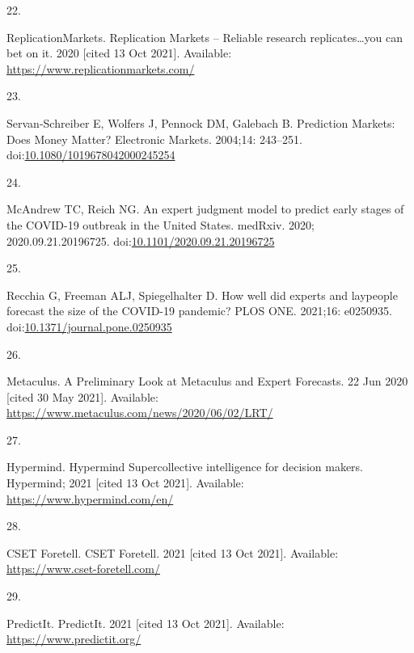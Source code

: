 \documentclass[10pt,letterpaper]{article}
\newlength{\cslhangindent}
\newlength{\csllabelwidth}
\newlength{\cslentryspacingunit} %
\newenvironment{CSLReferences}[2] %
 {%
  \setlength{\parindent}{0pt}
  \ifodd #1
  \let\oldpar\par
  \def\par{\hangindent=\cslhangindent\oldpar}
  \fi
  \setlength{\parskip}{#2\cslentryspacingunit}
 }%
 {}
\newcommand{\CSLLeftMargin}[1]{\parbox[t]{\csllabelwidth}{#1}}
\newcommand{\CSLRightInline}[1]{\parbox[t]{\linewidth - \csllabelwidth}{#1}\break}
\begin{document}
\begin{CSLReferences}{0}{0}
\leavevmode{}%
\CSLLeftMargin{22. }
\CSLRightInline{ReplicationMarkets. Replication {Markets} -- {Reliable}
research replicates\ldots you can bet on it. 2020 {[}cited 13 Oct
2021{]}. Available: \url{https://www.replicationmarkets.com/}}

\leavevmode{}%
\CSLLeftMargin{23. }
\CSLRightInline{Servan-Schreiber E, Wolfers J, Pennock DM, Galebach B.
Prediction {Markets}: {Does Money Matter}? Electronic Markets. 2004;14:
243--251.
doi:\href{https://doi.org/10.1080/1019678042000245254}{10.1080/1019678042000245254}}

\leavevmode{}%
\CSLLeftMargin{24. }
\CSLRightInline{McAndrew TC, Reich NG. An expert judgment model to
predict early stages of the {COVID-19} outbreak in the {United States}.
medRxiv. 2020; 2020.09.21.20196725.
doi:\href{https://doi.org/10.1101/2020.09.21.20196725}{10.1101/2020.09.21.20196725}}

\leavevmode{}%
\CSLLeftMargin{25. }
\CSLRightInline{Recchia G, Freeman ALJ, Spiegelhalter D. How well did
experts and laypeople forecast the size of the {COVID-19} pandemic? PLOS
ONE. 2021;16: e0250935.
doi:\href{https://doi.org/10.1371/journal.pone.0250935}{10.1371/journal.pone.0250935}}

\leavevmode{}%
\CSLLeftMargin{26. }
\CSLRightInline{Metaculus. A {Preliminary Look} at {Metaculus} and
{Expert Forecasts}. 22 Jun 2020 {[}cited 30 May 2021{]}. Available:
\url{https://www.metaculus.com/news/2020/06/02/LRT/}}

\leavevmode{}%
\CSLLeftMargin{27. }
\CSLRightInline{Hypermind. Hypermind \textbar{} {Supercollective}
intelligence for decision makers. {Hypermind}; 2021 {[}cited 13 Oct
2021{]}. Available: \url{https://www.hypermind.com/en/}}

\leavevmode{}%
\CSLLeftMargin{28. }
\CSLRightInline{CSET Foretell. {CSET Foretell}. 2021 {[}cited 13 Oct
2021{]}. Available: \url{https://www.cset-foretell.com/}}

\leavevmode{}%
\CSLLeftMargin{29. }
\CSLRightInline{PredictIt. {PredictIt}. 2021 {[}cited 13 Oct 2021{]}.
Available: \url{https://www.predictit.org/}}


\end{CSLReferences}
\end{document}

